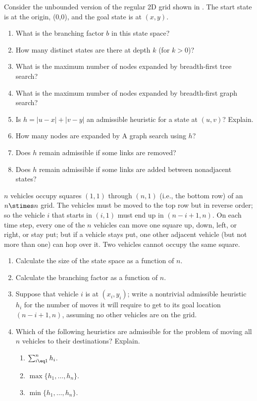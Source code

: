 \begin{exercise}%
Consider the unbounded version of the regular 2D grid shown in
. The start state is at the
origin, (0,0), and the goal state is at \((x,y)\).
\begin{enumerate}
\item What is the branching factor \(b\) in this state space?
\item How many distinct states are there at depth \(k\) (for \(k>0\))?
\item What is the maximum number of nodes expanded by breadth-first tree search?
\item What is the maximum number of nodes expanded by breadth-first graph search?
\item Is \(h = |u-x| + |v-y|\) an admissible heuristic for a state at \((u,v)\)? Explain.
\item How many nodes are expanded by A{\star} graph search using \(h\)?
\item Does \(h\) remain admissible if some links are removed?
\item Does \(h\) remain admissible if some links are added between nonadjacent states?
\end{enumerate}
\end{exercise} 

\begin{uexercise}%
\(n\) vehicles occupy squares \((1,1)\) through \((n,1)\) (i.e., the
bottom row) of an \(n\stimes n\) grid.  The vehicles must be moved to
the top row but in reverse order; so the vehicle \(i\) that starts in
\((i,1)\) must end up in \((n-i+1,n)\). On each time step, every one
of the \(n\) vehicles can move one square up, down, left, or right, or
stay put; but if a vehicle stays put, one other adjacent vehicle (but
not more than one) can hop over it. Two vehicles cannot occupy the
same square.
\begin{enumerate}
\item Calculate the size of the state space as a function of \(n\).
\item Calculate the branching factor as a function of \(n\).
\item Suppose that vehicle \(i\) is at \((x_i,y_i)\); write a nontrivial admissible heuristic \(h_i\) for the
number of moves it will require to get to its goal location \((n-i+1,n)\), assuming no other
vehicles are on the grid.
\item Which of the following heuristics are admissible for the problem
of moving all \(n\) vehicles to their destinations? Explain.
\begin{enumerate}
\item \(\sum_{i\eq 1}^{n} h_i\).
\item \(\max\{h_1,\ldots,h_n\}\).
\item \(\min\{h_1,\ldots,h_n\}\).
\end{enumerate}
\end{enumerate}
\end{uexercise} 

